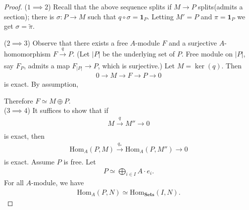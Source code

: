 \documentclass[12pt]{article}
\theoremstyle{plain}
\theoremstyle{remark}
\theoremstyle{definition}
\newcommand{\Hom}[3]{\mathrm{Hom}_{#3}(#1,#2)}
\begin{document}
\begin{proof}
    ($1\implies 2$) Recall that the above sequence splits if $M\rightarrow P$ splits(admits a section); there is $\sigma:P\rightarrow M$ such that $q\circ \sigma=\mathbf{1}_{P}$. Letting $M'=P$ and $\pi=\mathbf{1}_P$ we get $\sigma=\tilde{\pi}$.
    \begin{figure}[H]
        \centering
    \end{figure}
    \noindent ($2\implies 3$) Observe that there exists a free $A$-module $F$ and a surjective $A$-homomorphism $F\xrightarrow[]{q}P$. (Let $|P|$ be the underlying set of $P$. Free module on $|P|$, say $F_{P}$, admits a map $F_{|P|}\rightarrow P$, which is surjective.) Let $M=\ker(q)$. Then
    \begin{align*}
        0\rightarrow M\rightarrow F\rightarrow P\rightarrow 0
    \end{align*}
    is exact. By assumption,
    \begin{figure}[H]
        \centering
    \end{figure}
    \noindent Therefore $F\simeq M\oplus P$. \\
    ($3\implies 4$) It suffices to show that if
    \begin{align*}
        M\xrightarrow[]{q}M''\rightarrow 0
    \end{align*}
    is exact, then
    \begin{align*}
        \Hom{P}{M}{A}\xrightarrow[]{q_*}\Hom{P}{M''}{A}\rightarrow 0
    \end{align*}
    is exact. Assume $P$ is free. Let
    \begin{align*}
        P\simeq \bigoplus_{i\in I} A\cdot e_i.
    \end{align*}
    For all $A$-module, we have
    \begin{align*}
        \Hom{P}{N}{A}\simeq \Hom{I}{N}{\mathbf{Sets}}.

\end{align*}
\end{proof}
\end{document}
